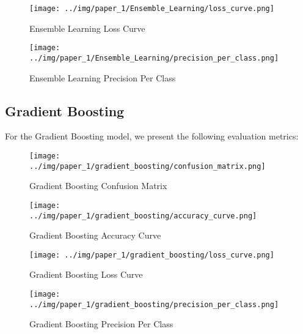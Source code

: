 \begin{figure}[H]
	\centering
	\texttt{[image: ../img/paper\_1/Ensemble\_Learning/loss\_curve.png]}
	\caption{Ensemble Learning Loss Curve}
\end{figure}

\begin{figure}[H]
	\centering
	\texttt{[image: ../img/paper\_1/Ensemble\_Learning/precision\_per\_class.png]}
	\caption{Ensemble Learning Precision Per Class}
\end{figure}

\subsection{Gradient Boosting}

For the Gradient Boosting model, we present the following evaluation metrics:

\begin{figure}[H]
	\centering
	\texttt{[image: ../img/paper\_1/gradient\_boosting/confusion\_matrix.png]}
	\caption{Gradient Boosting Confusion Matrix}
\end{figure}

\begin{figure}[H]
	\centering
	\texttt{[image: ../img/paper\_1/gradient\_boosting/accuracy\_curve.png]}
	\caption{Gradient Boosting Accuracy Curve}
\end{figure}

\begin{figure}[H]
	\centering
	\texttt{[image: ../img/paper\_1/gradient\_boosting/loss\_curve.png]}
	\caption{Gradient Boosting Loss Curve}
\end{figure}

\begin{figure}[H]
	\centering
	\texttt{[image: ../img/paper\_1/gradient\_boosting/precision\_per\_class.png]}
	\caption{Gradient Boosting Precision Per Class}
\end{figure}
